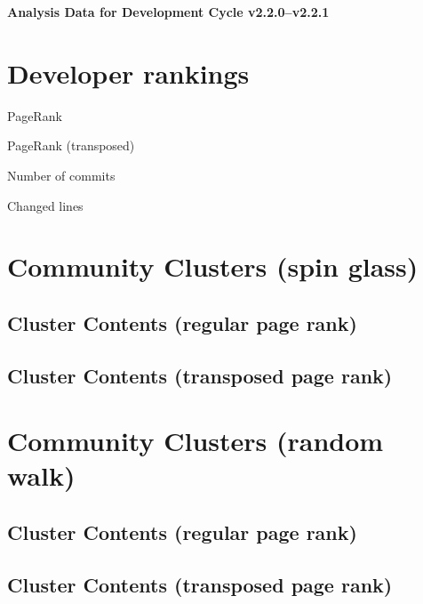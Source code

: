 \documentclass{article}
\begin{document}
\setlength{\parindent}{0pt}
\begin{center}
\begin{Large}
\textbf{Analysis Data for Development Cycle v2.2.0--v2.2.1}
\end{Large}
\end{center}
\section{Developer rankings}
\begin{small}\renewcommand{\tabcolsep}{1pt}
\begin{minipage}{0.5\linewidth}
PageRank\\

\end{minipage}%
\begin{minipage}{0.5\linewidth}
PageRank (transposed)\\

\end{minipage}

\renewcommand{\tabcolsep}{5pt}
\begin{minipage}{0.5\linewidth}
Number of commits\\

\end{minipage}%
\begin{minipage}{0.5\linewidth}
Changed lines\\

\end{minipage}
\end{small}
\newpage\section{Community Clusters (spin glass)}
\subsection{Cluster Contents (regular page rank)}
\newpage\subsection{Cluster Contents (transposed page rank)}
\newpage\section{Community Clusters (random walk)}
\subsection{Cluster Contents (regular page rank)}
\newpage\subsection{Cluster Contents (transposed page rank)}
\end{document}
